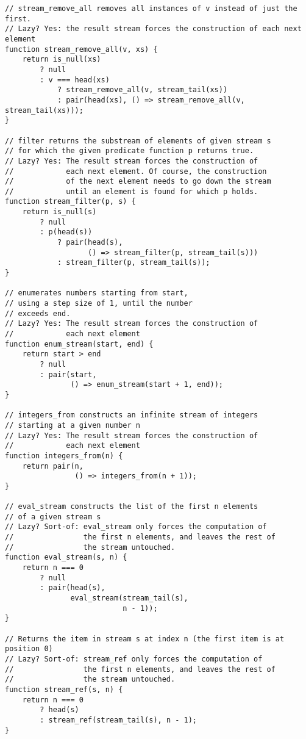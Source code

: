 \begin{lstlisting}
// stream_remove_all removes all instances of v instead of just the first.
// Lazy? Yes: the result stream forces the construction of each next element
function stream_remove_all(v, xs) {
    return is_null(xs)
        ? null
        : v === head(xs)
            ? stream_remove_all(v, stream_tail(xs))
            : pair(head(xs), () => stream_remove_all(v, stream_tail(xs))); 
}

// filter returns the substream of elements of given stream s
// for which the given predicate function p returns true.
// Lazy? Yes: The result stream forces the construction of
//            each next element. Of course, the construction
//            of the next element needs to go down the stream
//            until an element is found for which p holds.
function stream_filter(p, s) {
    return is_null(s)
        ? null
        : p(head(s))
            ? pair(head(s), 
                   () => stream_filter(p, stream_tail(s)))
            : stream_filter(p, stream_tail(s));
}

// enumerates numbers starting from start,
// using a step size of 1, until the number
// exceeds end.
// Lazy? Yes: The result stream forces the construction of
//            each next element
function enum_stream(start, end) {
    return start > end
        ? null
        : pair(start, 
               () => enum_stream(start + 1, end)); 
}

// integers_from constructs an infinite stream of integers
// starting at a given number n
// Lazy? Yes: The result stream forces the construction of
//            each next element
function integers_from(n) {
    return pair(n,
                () => integers_from(n + 1));
}

// eval_stream constructs the list of the first n elements
// of a given stream s
// Lazy? Sort-of: eval_stream only forces the computation of
//                the first n elements, and leaves the rest of
//                the stream untouched.
function eval_stream(s, n) {
    return n === 0
        ? null
        : pair(head(s),
               eval_stream(stream_tail(s),
                           n - 1));
}

// Returns the item in stream s at index n (the first item is at position 0)
// Lazy? Sort-of: stream_ref only forces the computation of
//                the first n elements, and leaves the rest of
//                the stream untouched.
function stream_ref(s, n) {
    return n === 0
        ? head(s)
        : stream_ref(stream_tail(s), n - 1);
}
\end{lstlisting}
